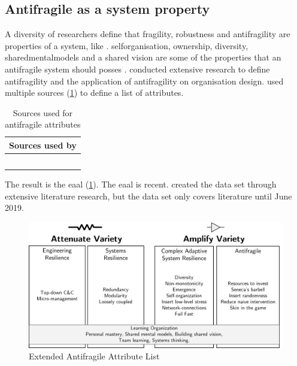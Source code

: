 \subsection{Antifragile as a system property}
\label{sub:backgroundafpropertyofsystem}
A diversity of researchers define that \gls{fragility}, \gls{robustness} and \gls{antifragility} are properties of a system, like \textcites{Jaaron2014}{Kastner2017}{OReilly2019}{Botjes2021}. \Gls{selforganisation}, ownership, \gls{diversity}, \glspl{sharedmentalmodel} and a shared vision are some of the properties that an \gls{antifragile} system should posses \parencites{Jaaron2014}{Hole2016}{Kastner2017}{OReilly2019}{Botjes2021}. \textcite{Botjes2021} conducted extensive research to define \gls{antifragility} and the application of \gls{antifragility} on organisation design. \citeauthor{Botjes2021} used multiple sources (\cref{tab:tbsourcesofantifragileattributes}) to define a list of attributes.
\begin{table}[H]
	\centering
	\begin{tabular}{@{}p{}p{}@{}}
		\toprule
		\multicolumn{2}{c}{\textbf{Sources used by \textcite{Botjes2021}}} \\%
		\midrule
		\textcite{Ghasemi2017} & \textcite{Johnson2013} \\%
		\textcite{Kennon2015} & \textcite{Markey2018} \\%
		\textcite{Hendriksson2016} & \textcite{Kastner2017} \\%
		\textcite{Gorgeon2015} & \textcite{Hole2016} \\%
		\textcite{OReilly2019} & \\%
		\bottomrule
	\end{tabular}%
	\caption[Sources used for antifragile attributes]{Sources used for antifragile attributes}
	\label{tab:tbsourcesofantifragileattributes}%
\end{table}%
The result is the \acrfull{eaal} (\cref{fig:eaalbw}). The \acrfull{eaal} is recent. \citeauthor[p.~5]{Botjes2021} created the data set through extensive literature research, but the data set only covers literature until June 2019. 
\begin{figure}[H]
	\centering
	\includegraphics[width=0.8\linewidth]{images/eaalbw}
	\caption[Extended Antifragile Attribute List \parencite{Botjes2021}]{Extended Antifragile Attribute List \Parencite{Botjes2021}}
	\label{fig:eaalbw}
\end{figure}
